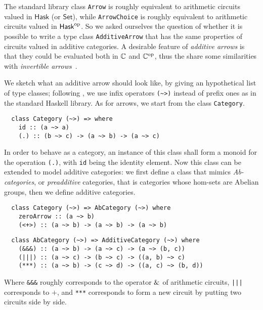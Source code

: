 The standard library class \lstinline+Arrow+ is roughly equivalent to
arithmetic circuits valued in $\mathsf{Hask}$ (or $\mathsf{Set}$),
while \lstinline+ArrowChoice+ is roughly equivalent to arithmetic
circuits valued in $\mathsf{Hask}^{\mathrm{op}}$. So we asked ourselves the
question of whether it is possible to write a type class
\lstinline+AdditiveArrow+ that has the same properties of circuits
valued in additive categories. A desirable feature of \emph{additive
  arrows} is that they could be evaluated both in $\mathbb{C}$ and $\mathbb{C}^{\mathrm{op}}$,
thus the share some similarities with \emph{invertible
  arrows}~\cite{alimarine+al:invertible-arrows}.

We sketch what an additive arrow should look like, by giving an
hypothetical list of type classes; following
\cite{yorgey:typeclassopedia}, we use infix operators \lstinline+(~>)+
instead of prefix ones as in the standard Haskell library.  As for
arrows, we start from the class \lstinline+Category+.

\begin{lstlisting}
  class Category (~>) => where
    id :: (a ~> a)
    (.) :: (b ~> c) -> (a ~> b) -> (a ~> c)
\end{lstlisting}

In order to behave as a category, an instance of this class shall form
a monoid for the operation \lstinline+(.)+, with \lstinline+id+ being
the identity element. Now this class can be extended to model additive
categories: we first define a class that mimics \emph{Ab-categories},
or \emph{preadditive} categories, that is categories whose hom-sets
are Abelian groups, then we define additive categories.

\begin{lstlisting}
  class Category (~>) => AbCategory (~>) where
    zeroArrow :: (a ~> b)
    (<+>) :: (a ~> b) -> (a ~> b) -> (a ~> b)
\end{lstlisting}

\begin{lstlisting}
  class AbCategory (~>) => AdditiveCategory (~>) where
    (&&&) :: (a ~> b) -> (a ~> c) -> (a ~> (b, c))
    (|||) :: (a ~> c) -> (b ~> c) -> ((a, b) ~> c)
    (***) :: (a ~> b) -> (c ~> d) -> ((a, c) ~> (b, d))
\end{lstlisting}

Where \lstinline+&&&+ roughly corresponds to the operator $\operatorname{\&}$ of
arithmetic circuits, \lstinline+|||+ corresponds to $+$, and
\lstinline+***+ corresponds to form a new circuit by putting two
circuits side by side.

